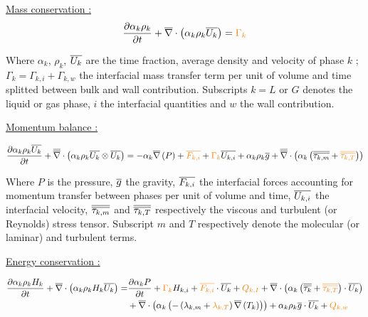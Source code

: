 \underline{Mass conservation :}
\begin{equation}
	\label{eq:mass}
	\dtime{\alpha_{k}\rho_{k}} + \divg{\alpha_{k}\rho_{k} \vect{U_{k}}} = \orangemath{\Gamma_{k}}
\end{equation}

Where $\alpha_{k}$, $\rho_{k}$, $\overline{U_{k}}$ are the time fraction, average density and velocity of phase $k$ ; $\Gamma_{k}=\Gamma_{k,i}+\Gamma_{k,w}$ the interfacial mass transfer term per unit of volume and time splitted between bulk and wall contribution.
Subscripts $k= L$ or $G$ denotes the liquid or gas phase, $i$ the interfacial quantities and $w$ the wall contribution.

\underline{Momentum balance :}

\begin{equation}
	\label{eq:momentum}
	\dtime{\alpha_{k}\rho_{k}\vect{U_{k}}} + \vecdivg{\alpha_{k}\rho_{k} \vect{U_{k}}\otimes \vect{U_{k}}} = -\alpha_{k}\grad{P} + \orangemath{\vect{F_{k,i}}} + \orangemath{\Gamma_{k}}\vect{U_{k,i}} + \alpha_{k}\rho_{k}\vect{g} + \vecdivg{\alpha_{k} \parth{ \tens{\tau_{k,m}} + \orangemath{\tens{\tau_{k,T}}} }}
\end{equation}

Where $P$ is the pressure, $\overline{g}$ the gravity, $\overline{F_{k,i}}$ the interfacial forces accounting for momentum transfer between phases per unit of volume and time, $\overline{U_{k,i}}$ the interfacial velocity, $\overline{\overline{\tau_{k,m}}}$ and $\overline{\overline{\tau_{k,T}}}$ respectively the viscous and turbulent (or Reynolds) stress tensor. Subscript $m$ and $T$ respectively denote the molecular (or laminar) and turbulent terms.

\underline{Energy conservation :}

\begin{equation}
	\label{eq:energy}
\begin{aligned}
	\dtime{\alpha_{k}\rho_{k} H_{k}} + \divg{\alpha_{k}\rho_{k} H_{k}\vect{U_{k}}} =& \dtime{\alpha_{k}P} + \orangemath{\Gamma_{k}}H_{k,i}+\orangemath{\vect{F_{k,i}}}\cdot \vect{U_{k}} + \orangemath{Q_{k,I}} + \divg{\alpha_{k}\parth{ \tens{\tau_{k}} + \orangemath{\tens{\tau_{k,T}}} }\cdot \vect{U_{k}}}\\
	& + \divg{\alpha_{k} \parth{-\parth{ \lambda_{k,m}+\orangemath{\lambda_{k,T}}}\grad{T_{k}}}} + \alpha_{k}\rho_{k}\vect{g}\cdot \vect{U_{k}} + \orangemath{Q_{k,w}}
\end{aligned}
\end{equation}

